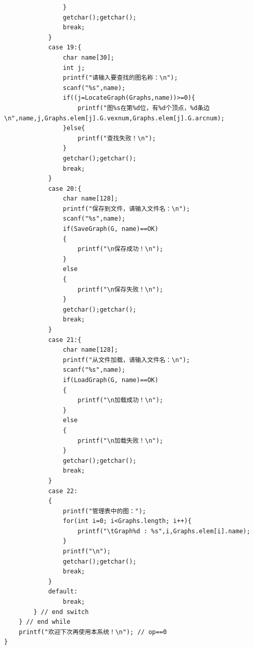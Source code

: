 \documentclass[supercite]{Experimental_Report}
\theoremstyle{definition}
\begin{document}
\begin{lstlisting}
                }
                getchar();getchar();
                break;
            }
            case 19:{
                char name[30];
                int j;
                printf("请输入要查找的图名称：\n");
                scanf("%s",name);
                if((j=LocateGraph(Graphs,name))>=0){
                    printf("图%s在第%d位，有%d个顶点，%d条边\n",name,j,Graphs.elem[j].G.vexnum,Graphs.elem[j].G.arcnum);
                }else{
                    printf("查找失败！\n");
                }
                getchar();getchar();
                break;
            }
            case 20:{
                char name[128];
                printf("保存到文件，请输入文件名：\n");
                scanf("%s",name);
                if(SaveGraph(G, name)==OK)
                {
                    printf("\n保存成功！\n");
                }
                else
                {
                    printf("\n保存失败！\n");
                }
                getchar();getchar();
                break;
            }
            case 21:{
                char name[128];
                printf("从文件加载，请输入文件名：\n");
                scanf("%s",name);
                if(LoadGraph(G, name)==OK)
                {
                    printf("\n加载成功！\n");
                }
                else
                {
                    printf("\n加载失败！\n");
                }
                getchar();getchar();
                break;
            }
            case 22:
            {
                printf("管理表中的图：");
                for(int i=0; i<Graphs.length; i++){
                    printf("\tGraph%d : %s",i,Graphs.elem[i].name);
                }
                printf("\n");
                getchar();getchar();
                break;
            }
            default:
                break;
        } // end switch
    } // end while
    printf("欢迎下次再使用本系统！\n"); // op==0
}

\end{lstlisting}
\end{document}
